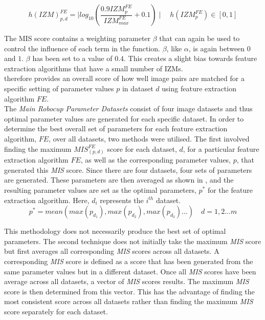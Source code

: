 \documentclass{report}
\begin{document}
\begin{equation}
h(\textit{IZM})_{p, d}^{FE} = \mid log_{10}(\frac{0.9\textit{IZM}_{p}^{FE}}{\textit{IZM}_{max}^{FE}} + 0.1) \mid \quad h(\textit{IZM}_{p}^{FE})\in [0, 1]
\label{eqn:izm}
\end{equation}

The MIS score contains a weighting parameter $\beta$ that can again be used to control the influence of each term in the function. $\beta$, like $\alpha$, is again between $0$ and $1$. $\beta$ has been set to a value of $0.4$. This creates a slight bias towards feature extraction algorithms that have a small number of IZMs. \\

 therefore provides an overall score of how well image pairs are matched for a specific setting of parameter values $p$ in dataset $d$ using feature extraction algorithm $FE$. \\

The \textit{Main Robocup Parameter Datasets} consist of four image datasets and thus  optimal parameter values are generated for each specific dataset. In order to determine the best overall set of parameters for each feature extraction algorithm, $FE$, over all datasets, two methods were utilised. The first involved finding the maximum $\textit{MIS}_{(p, d)}^{FE}$ score for each dataset, $d$, for a particular feature extraction algorithm $FE$, as well as the corresponding parameter values, $p$, that generated this \textit{MIS} score. Since there are four datasets, four sets of parameters are generated. These parameters are then averaged as shown in , and the resulting parameter values are set as the optimal parameters, $p^*$ for the feature extraction algorithm. Here, $d_i$ represents the $i^{th}$ dataset.\\

\begin{equation}
p^* = mean( max(p_{d_1}), max(p_{d_2}), max(p_{d_3}) ...) \quad d = 1,2...m
\label{eqn:average}
\end{equation}

This methodology does not necessarily produce the best set of optimal parameters. The second technique does not initially take the maximum \textit{MIS} score but first averages all corresponding \textit{MIS} scores across all datasets. A corresponding \textit{MIS} score is defined as a score that has been generated from the same parameter values but in a different dataset. Once all \textit{MIS} scores have been average across all datasets, a vector of \textit{MIS} scores results. The maximum \textit{MIS} score is then determined from this vector. This has the advantage of finding the most consistent score across all datasets rather than finding the maximum \textit{MIS} score separately for each dataset.\\
\end{document}
